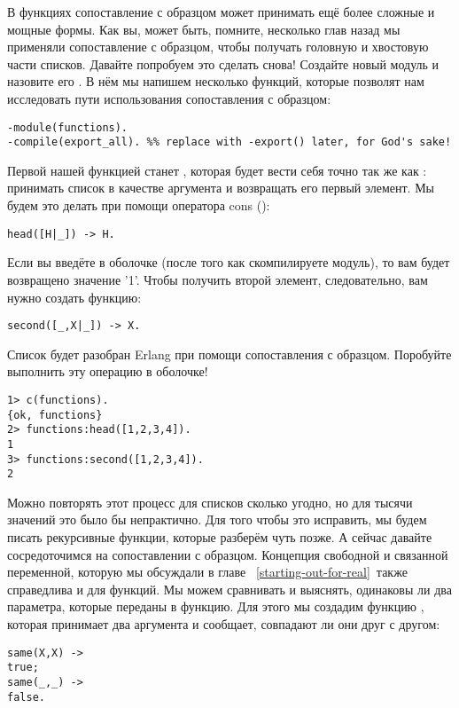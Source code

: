 В функциях сопоставление с образцом может принимать ещё более сложные и мощные формы.
Как вы, может быть, помните, несколько глав назад мы применяли сопоставление с образцом, чтобы получать головную и хвостовую части списков.
Давайте попробуем это сделать снова!
Создайте новый модуль и назовите его .
В нём мы напишем несколько функций, которые позволят нам исследовать пути использования сопоставления с образцом:
\begin{lstlisting}[style=erlang]
-module(functions).
-compile(export_all). %% replace with -export() later, for God's sake!
\end{lstlisting}

Первой нашей функцией станет , которая будет вести себя точно так же как : принимать список в качестве аргумента и возвращать его первый элемент.
Мы будем это делать при помощи оператора cons (\ops{\strut|}):
\begin{lstlisting}[style=erlang]
head([H|_]) -> H.
\end{lstlisting}

Если вы введёте в оболочке  (после того как скомпилируете модуль), то вам будет возвращено значение '1'.
Чтобы получить второй элемент, следовательно, вам нужно создать функцию: 
\begin{lstlisting}[style=erlang]
second([_,X|_]) -> X.
\end{lstlisting}

Список будет разобран Erlang при помощи сопоставления с образцом.
Поробуйте выполнить эту операцию в оболочке!
\begin{lstlisting}[style=erlang]
1> c(functions).
{ok, functions}
2> functions:head([1,2,3,4]).
1
3> functions:second([1,2,3,4]).
2
\end{lstlisting}

Можно повторять этот процесс для списков сколько угодно, но для тысячи значений это было бы непрактично.
Для того чтобы это исправить, мы будем писать рекурсивные функции, которые разберём чуть позже.
А сейчас давайте сосредоточимся на сопоставлении с образцом.
Концепция свободной и связанной переменной, которую мы обсуждали в главе ~\ref{starting-out-for-real}~также справедлива и для функций.
Мы можем сравнивать и выяснять, одинаковы ли два параметра, которые переданы в функцию.
Для этого мы создадим функцию , которая принимает два аргумента и сообщает, совпадают ли они друг с другом:
\begin{lstlisting}[style=erlang]
same(X,X) ->
true;
same(_,_) ->
false.
\end{lstlisting}

